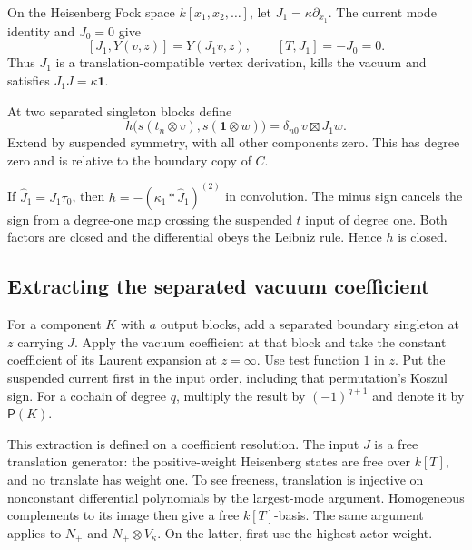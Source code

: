 On the Heisenberg Fock space $k[x_1,x_2,\ldots]$,
let $J_1=\kappa\partial_{x_1}$.
The current mode identity and $J_0=0$ give
\[
 [J_1,Y(v,z)]=Y(J_1v,z),\qquad [T,J_1]=-J_0=0.
\]
Thus $J_1$ is a translation-compatible vertex
derivation, kills the vacuum and satisfies
$J_1J=\kappa\mathbf1$.

At two separated singleton blocks define
\begin{equation}\label{cbc:va:boundary-loop}
 h\bigl(s(t_n\otimes v),s(\mathbf1\otimes w)\bigr)
     =\delta_{n0}\,v\boxtimes J_1w.
\end{equation}
Extend by suspended symmetry, with all other
components zero. This has degree zero and is relative
to the boundary copy of $C$.

If $\widehat J_1=J_1\tau_0$, then
$h=-(\kappa_1*\widehat J_1)^{(2)}$ in convolution.
The minus sign cancels the sign from a degree-one
map crossing the suspended $t$ input of degree one.
Both factors are closed and the differential obeys
the Leibniz rule. Hence $h$ is closed.

\subsection{Extracting the separated vacuum coefficient}

For a component $K$ with $a$ output blocks, add a
separated boundary singleton at $z$ carrying $J$.
Apply the vacuum coefficient at that block and take
the constant coefficient of its Laurent expansion
at $z=\infty$. Use test function $1$ in $z$.
Put the suspended current first in the input order,
including that permutation's Koszul sign.
For a cochain of degree $q$, multiply the result by
$(-1)^{q+1}$ and denote it by $\mathsf P(K)$.

This extraction is defined on a coefficient resolution.
The input $J$ is a free translation generator: the
positive-weight Heisenberg states are free over $k[T]$,
and no translate has weight one. To see freeness,
translation is injective on nonconstant differential
polynomials by the largest-mode argument. Homogeneous
complements to its image then give a free $k[T]$-basis.
The same argument applies to $N_+$ and $N_+\otimes V_\kappa$.
On the latter, first use the highest actor weight.

